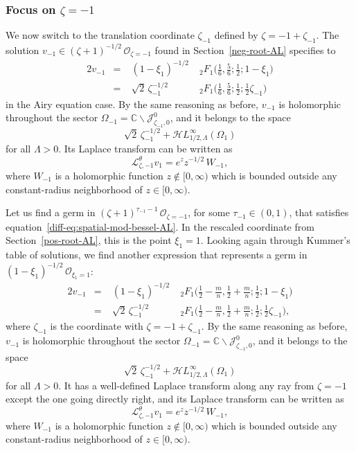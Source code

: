 \documentclass{article}
\newcommand{\singexp}[2]{\mathcal{H}L^\infty_{#1, #2}}
\newcommand{\C}{\mathbb{C}}
\newcommand{\laplace}{\mathcal{L}}
\theoremstyle{definition}
\theoremstyle{plain}
\newenvironment{old}{\color{RoyalBlue}}{\color{black}}
\newenvironment{revised}{\color{DarkBlue}}{\color{black}}
\begin{document}
\subsubsection{Focus on $\zeta = -1$}\label{neg-root}
%
\begin{revised}
We now switch to the translation coordinate $\zeta_{-1}$ defined by $\zeta = -1 + \zeta_{-1}$. The solution $v_{-1} \in (\zeta+1)^{-1/2}\,\mathcal{O}_{\zeta=-1}$ found in Section~\ref{neg-root-AL} specifies to
\begin{alignat*}{2}
v_{-1} &=\;& (1-\xi_1)^{-1/2} &\;{}_2F_1\big(\tfrac{1}{6}, \tfrac{5}{6}; \tfrac{1}{2}; 1-\xi_1\big) \\[1mm]
&=\;& \sqrt{2}\,\zeta_{-1}^{-1/2} &\;{}_2F_1\big(\tfrac{1}{6}, \tfrac{5}{6}; \tfrac{1}{2}; \tfrac{1}{2}\zeta_{-1}\big)
\end{alignat*}
in the Airy equation case. By the same reasoning as before, $v_{-1}$ is holomorphic throughout the sector $\Omega_{-1} = \C \smallsetminus \mathcal{J}^0_{\zeta_{-1}, 0}$, and it belongs to the space
\[ \sqrt{2}\,\zeta_{-1}^{-1/2} + \singexp{1/2}{\Lambda}(\Omega_1) \]
for all $\Lambda > 0$. Its Laplace transform can be written as
\[ \laplace^\theta_{\zeta, -1} v_1 = e^z z^{-1/2}\,W_{-1}, \]
where $W_{-1}$ is a holomorphic function $z \notin [0, \infty)$ which is bounded outside any constant-radius neighborhood of $z \in [0, \infty)$.
\end{revised}
\begin{old}\par
Let us find a germ in $(\zeta+1)^{\tau_{-1}-1}\,\mathcal{O}_{\zeta=-1}$, for some $\tau_{-1} \in (0, 1)$, that satisfies equation~\eqref{diff-eq:spatial-mod-bessel-AL}. In the rescaled coordinate from Section~\ref{pos-root-AL}, this is the point $\xi_1 = 1$. Looking again through Kummer's table of solutions, we find another expression \cite[formula~15.10.14]{dlmf} that represents a germ in $(1-\xi_1)^{-1/2}\,\mathcal{O}_{\xi_1=1}$:
\begin{alignat*}{2}
v_{-1} &=\;& (1-\xi_1)^{-1/2} &\;{}_2F_1\big(\tfrac{1}{2}-\tfrac{m}{n}, \tfrac{1}{2}+\tfrac{m}{n}; \tfrac{1}{2}; 1-\xi_1\big) \\[1mm]
&=\;& \sqrt{2}\,\zeta_{-1}^{-1/2} &\;{}_2F_1\big(\tfrac{1}{2}-\tfrac{m}{n}, \tfrac{1}{2}+\tfrac{m}{n}; \tfrac{1}{2}; \tfrac{1}{2}\zeta_{-1}\big),
\end{alignat*}
where $\zeta_{-1}$ is the coordinate with $\zeta = -1 + \zeta_{-1}$. By the same reasoning as before, $v_{-1}$ is holomorphic throughout the sector $\Omega_{-1} = \C \smallsetminus \mathcal{J}^0_{\zeta_{-1}, 0}$, and it belongs to the space
\[ \sqrt{2}\,\zeta_{-1}^{-1/2} + \singexp{1/2}{\Lambda}(\Omega_1) \]
for all $\Lambda > 0$. It has a well-defined Laplace transform along any ray from $\zeta = -1$ except the one going directly right, and its Laplace transform can be written as
\[ \laplace^\theta_{\zeta, -1} v_1 = e^z z^{-1/2}\,W_{-1}, \]
where $W_{-1}$ is a holomorphic function $z \notin [0, \infty)$ which is bounded outside any constant-radius neighborhood of $z \in [0, \infty)$.
\end{old}
%
\end{document}
